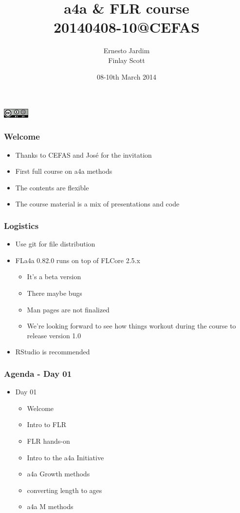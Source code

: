 \documentclass{beamer}%
\title[a4a \& FLR]{a4a \& FLR course \\ 20140408-10@CEFAS}
\author{Ernesto Jardim\\Finlay Scott}
\institute[JRC]{European Commission\\ Joint Research Centre \\ (JRC)}
\date[SWWK]{08-10th March 2014}
\begin{document}
\begin{frame}%
\titlepage
	\begin{flushright}
		\includegraphics[width=0.1\textwidth]{cc.png}
	\end{flushright}
\end{frame}

\begin{frame}
   \frametitle{Welcome}
	\begin{itemize}
		\item Thanks to CEFAS and Jos\'e for the invitation
		\item First full course on a4a methods
		\item The contents are flexible
		\item The course material is a mix of presentations and code
	\end{itemize}
\end{frame}

\begin{frame}
   \frametitle{Logistics}
	\begin{itemize}
		\item Use git for file distribution
		\item FLa4a 0.82.0 runs on top of FLCore 2.5.x
		\begin{itemize}
			\item It's a beta version
			\item There maybe bugs
			\item Man pages are not finalized
			\item We're looking forward to see how things workout during the course to release version 1.0
		\end{itemize}
		\item RStudio is recommended
	\end{itemize}
\end{frame}

\begin{frame}
   \frametitle{Agenda - Day 01}
	\begin{itemize}
		\item Day 01
		\begin{itemize}
			\item Welcome
			\item Intro to FLR
			\item FLR hands-on
			\item Intro to the a4a Initiative
			\item a4a Growth methods
			\item converting length to ages
			\item a4a M methods
		\end{itemize}
	\end{itemize}
\end{frame}
\end{document}

